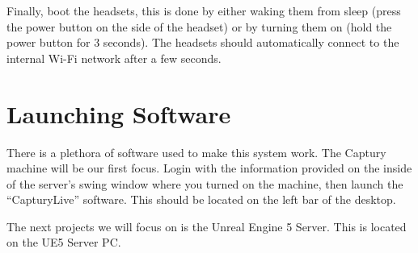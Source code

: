 Finally, boot the headsets, this is done by either waking them from sleep (press the power button on the side of the headset) or by turning them on (hold the power button for 3 seconds). The headsets should automatically connect to the internal Wi-Fi network after a few seconds.

\section{Launching Software}
There is a plethora of software used to make this system work. The Captury machine will be our first focus. Login with the information provided on the inside of the server's swing window where you turned on the machine, then launch the ``CapturyLive'' software. This should be located on the left bar of the desktop.

The next projects we will focus on is the Unreal Engine 5 Server. This is located on the UE5 Server PC. 
